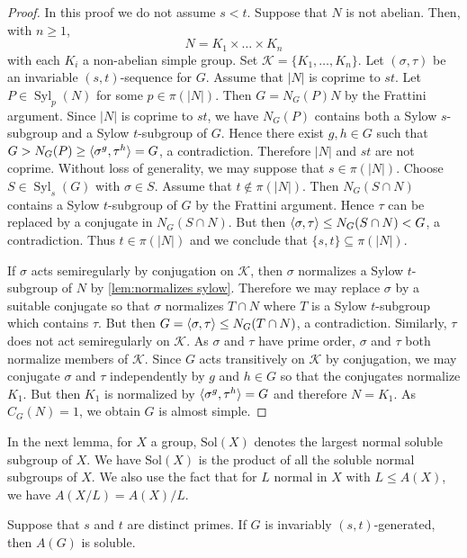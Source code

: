\documentclass[12pt,a4paper]{amsart}
\DeclareMathOperator{\Syl}{Syl}
\DeclareMathOperator{\syl}{Syl}
\DeclarePairedDelimiter{\gen}{\langle}{\rangle}
\begin{document}
\begin{proof} In this proof we do not assume $s<t$.
Suppose that $N$ is not abelian. Then, with $n \ge 1$, $$N=K_1\times \dots \times K_n$$  with each $K_i$ a non-abelian simple group. Set $\mathcal K=\{K_1,\dots, K_n\}$.  Let $(\sigma, \tau)$ be an invariable $(s,t)$-sequence for $G$. Assume that $|N|$ is coprime to $st$. Let $P \in \syl_p(N)$ for some $p \in \pi(|N|)$.  Then $G= N_G(P)N$ by the Frattini argument. Since $|N|$ is coprime to $st$, we have $N_G(P)$ contains both a Sylow $s$-subgroup and a Sylow $t$-subgroup of $G$. Hence there exist $g,h \in G$ such that $G>N_G(P) \ge \gen{\sigma^g,\tau^h}= G$, a contradiction. Therefore $|N|$ and $st$ are not coprime. Without loss of generality, we may suppose that $s \in \pi(|N|)$. Choose $S \in \Syl_s(G)$ with $\sigma \in S$.
 Assume that $t \not \in \pi(|N|)$. Then $N_G(S\cap N)$ contains a Sylow $t$-subgroup of $G$ by the Frattini argument. Hence $\tau$ can be replaced by a conjugate in $N_G(S\cap N)$. But then $\gen{\sigma,\tau} \le N_G(S\cap N)<G$, a contradiction.
 Thus $t \in \pi(|N|)$ and we conclude  that $\{s,t\} \subseteq \pi(|N|)$.

If $\sigma$ acts semiregularly by conjugation on $\mathcal K$, then $\sigma$ normalizes a Sylow $t$-subgroup of $N$ by \cref{lem:normalizes sylow}. Therefore we may replace $\sigma$ by a suitable conjugate  so that $\sigma$   normalizes $T\cap N$ where $T$ is a Sylow $t$-subgroup which contains $\tau$. But then $G =\gen{\sigma,\tau} \le N_G(T\cap N)$, a contradiction.  Similarly, $\tau$ does not act semiregularly on $\mathcal K$. As $\sigma$ and $\tau$ have prime order, $\sigma$ and $\tau$ both normalize members of $\mathcal K$. Since $G$ acts transitively on $\mathcal K$ by conjugation, we may   conjugate $\sigma$ and $\tau$ independently by $g$ and $h\in G$ so that the conjugates normalize $K_1$. But then $K_1 $ is normalized by $\gen{\sigma^g,\tau^h}=G$ and therefore $N=K_1$.  As $C_G(N)=1$, we obtain $G$ is almost simple.
\end{proof}


 In the next lemma, for $X$ a group, $\mathrm{Sol}(X)$ denotes the largest normal soluble subgroup of $X$. We have $\mathrm{Sol}(X)$ is the product of all the soluble normal subgroups of $X$. We also use the fact that for $L$ normal in $X$   with  $L \le A(X)$, we have $A(X/L)= A(X)/L$.

\begin{lemma}\label{lem:AGsol}
Suppose that $s$ and $t $ are distinct primes. If $G$ is   invariably $(s,t)$-generated, then  $A(G)$ is soluble.
\end{lemma}
\end{document}
